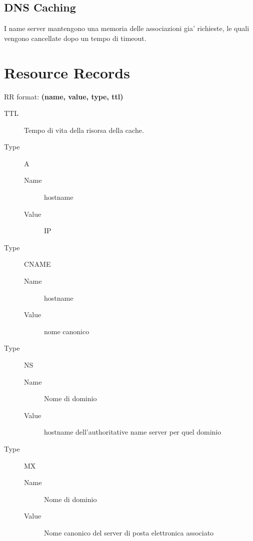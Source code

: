 \subsection{DNS Caching}
I name server mantengono una memoria delle associazioni gia' richieste, le quali vengono cancellate dopo un tempo di timeout.
\section{Resource Records}
\begin{center}
    RR format: \textbf{(name, value, type, ttl)}
\end{center}
\begin{description}
    \item[TTL] Tempo di vita della risorsa della cache.
    \item[Type] A 
    \begin{description}
        \item[Name]  hostname
        \item[Value] IP 
    \end{description}  
    \item[Type] CNAME
    \begin{description}
        \item[Name] hostname
        \item[Value] nome canonico  
    \end{description} 
    \item[Type] NS
    \begin{description}
        \item[Name] Nome di dominio
        \item[Value] hostname dell'authoritative name server per quel dominio
    \end{description} 
    \item[Type] MX
    \begin{description}
        \item[Name] Nome di dominio
        \item[Value] Nome canonico del server di posta elettronica associato
    \end{description} 
\end{description}
